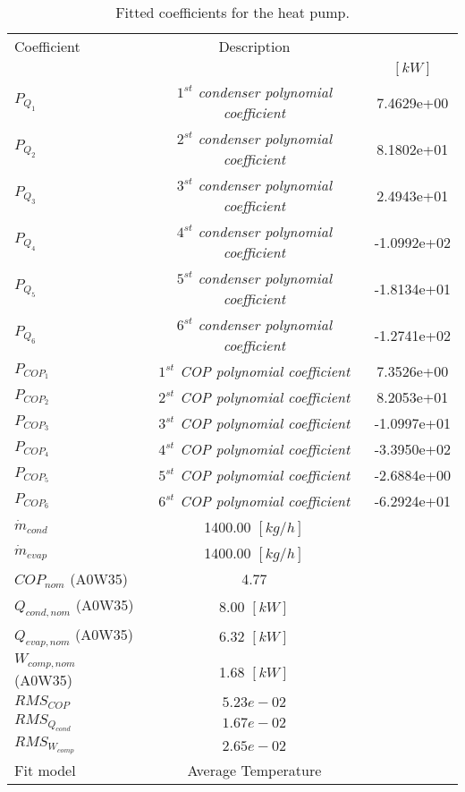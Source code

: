 \documentclass[english]{SPFShortReport}
\author{Dani Carbonell}
\begin{document}
\begin{table}[!ht]
\begin{small}
\caption{Fitted coefficients for the heat pump.}
\begin{center}
\resizebox{12cm}{!} 
{
\begin{tabular}{l | c c } 
\hline
\hline
Coefficient &Description & \\ 
 & &$[kW]$\\ 
\hline
$P_{Q_{1}}$ & \emph{$1^{st}$ condenser polynomial coefficient}  & 7.4629e+00    \\ 
$P_{Q_{2}}$ & \emph{$2^{st}$ condenser polynomial coefficient}  & 8.1802e+01    \\ 
$P_{Q_{3}}$ & \emph{$3^{st}$ condenser polynomial coefficient}  & 2.4943e+01    \\ 
$P_{Q_{4}}$ & \emph{$4^{st}$ condenser polynomial coefficient}  & -1.0992e+02    \\ 
$P_{Q_{5}}$ & \emph{$5^{st}$ condenser polynomial coefficient}  & -1.8134e+01    \\ 
$P_{Q_{6}}$ & \emph{$6^{st}$ condenser polynomial coefficient}  & -1.2741e+02    \\ 
\hline
$P_{COP_{1}}$ & \emph{$1^{st}$ COP polynomial coefficient}  & 7.3526e+00    \\ 
$P_{COP_{2}}$ & \emph{$2^{st}$ COP polynomial coefficient}  & 8.2053e+01    \\ 
$P_{COP_{3}}$ & \emph{$3^{st}$ COP polynomial coefficient}  & -1.0997e+01    \\ 
$P_{COP_{4}}$ & \emph{$4^{st}$ COP polynomial coefficient}  & -3.3950e+02    \\ 
$P_{COP_{5}}$ & \emph{$5^{st}$ COP polynomial coefficient}  & -2.6884e+00    \\ 
$P_{COP_{6}}$ & \emph{$6^{st}$ COP polynomial coefficient}  & -6.2924e+01    \\ 
\hline
$\dot m_{cond}$ & 1400.00 $[kg/h]$ \\ 
$\dot m_{evap}$ & 1400.00 $[kg/h]$ \\ 
\hline
$COP_{nom}$ (A0W35)& 4.77 \\ 
$Q_{cond,nom}$ (A0W35)& 8.00 $[kW]$\\ 
$Q_{evap,nom}$ (A0W35)& 6.32 $[kW]$\\ 
$W_{comp,nom}$ (A0W35)& 1.68 $[kW]$\\ 
\hline
 $RMS_{COP}$ & $5.23e-02$ \\ 
 $RMS_{Q_{cond}}$ & $1.67e-02$ \\ 
 $RMS_{W_{comp}}$ & $2.65e-02$ \\ 
\hline
Fit model & Average Temperature\\ 
\hline
\hline
\end{tabular}
}
\label{CoefTable}
\end{center}
\end{small}
\end{table}
\end{document}
